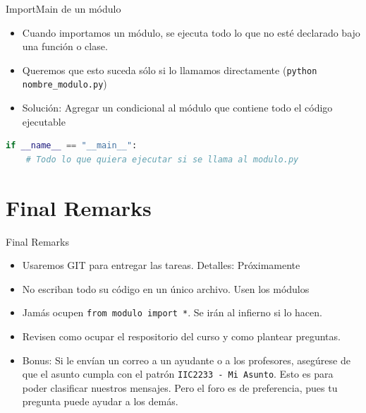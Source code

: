 \documentclass[spanish]{beamer}
\begin{document}
\begin{frame}[fragile]{Import}{Main de un módulo}
    \begin{itemize}
        \item Cuando importamos un módulo, se ejecuta todo lo que no esté declarado bajo una función o clase.
        \item Queremos que esto suceda sólo si lo llamamos directamente (\texttt{python nombre\_modulo.py})
        \pause
        \item Solución: Agregar un condicional al módulo que contiene todo el código ejecutable
    \end{itemize}
    \begin{lstlisting}[language=Python]
if __name__ == "__main__":
    # Todo lo que quiera ejecutar si se llama al modulo.py
  \end{lstlisting}
\end{frame}



\section*{Final Remarks}

\begin{frame}{Final Remarks}
  \begin{itemize}
    \item Usaremos GIT para entregar las tareas. \alert{Detalles: Próximamente}
    \item No escriban todo su código en un único archivo. Usen los módulos
    \item Jamás ocupen \texttt{from modulo import *}. Se irán al infierno si lo hacen.
    \item Revisen como ocupar el respositorio del curso y como plantear preguntas.
    \item Bonus: Si le envían un correo a un ayudante o a los  profesores, asegúrese de que el asunto cumpla con el patrón \texttt{IIC2233 - Mi Asunto}. Esto es para poder clasificar nuestros mensajes. Pero el foro es de preferencia, pues tu pregunta puede ayudar a los demás.
  \end{itemize}
\end{frame}
\end{document}
